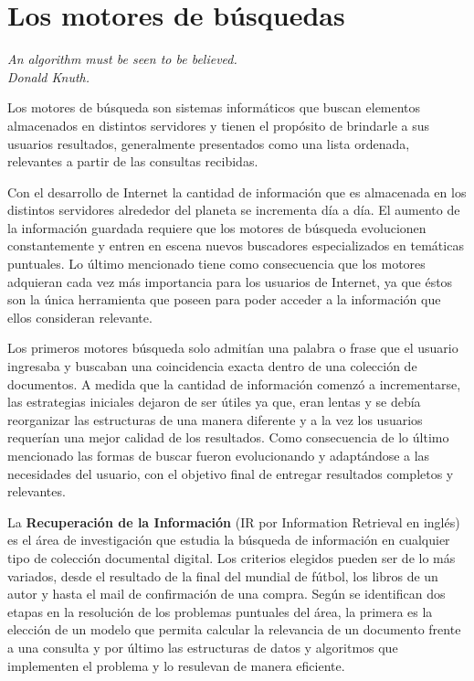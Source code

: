 \section{Los motores de búsquedas}
{\begin{small}%
\begin{flushright}%
\it An algorithm must be seen to be believed.\\Donald Knuth.
\end{flushright}%
\end{small}%
\vspace{.5cm}}
Los motores de búsqueda son sistemas informáticos que buscan elementos almacenados en distintos servidores y tienen el propósito de brindarle a sus usuarios resultados, generalmente presentados como una lista ordenada, relevantes a partir de las consultas recibidas.

Con el desarrollo de Internet la cantidad de información que es almacenada en los distintos servidores alrededor del planeta se incrementa día a día. El aumento de la información guardada requiere que los motores de búsqueda evolucionen constantemente y entren en escena nuevos buscadores especializados en temáticas puntuales. Lo último mencionado tiene como consecuencia que los motores adquieran cada vez más importancia para los usuarios de Internet, ya que éstos son la única herramienta que poseen para poder acceder a la información que ellos consideran relevante.

Los primeros motores búsqueda solo admitían una palabra o frase que el usuario ingresaba y buscaban una coincidencia exacta dentro de una colección de documentos. A medida que la cantidad de información comenzó a incrementarse, las estrategias iniciales dejaron de ser útiles ya que, eran lentas y se debía reorganizar las estructuras de una manera diferente y a la vez los usuarios requerían una mejor calidad de los resultados. Como consecuencia de lo último mencionado las formas de buscar fueron evolucionando y adaptándose a las necesidades del usuario, con el objetivo final de entregar resultados completos y relevantes.

La \textbf{Recuperación de la Información} (IR por Information Retrieval en inglés) \cite{Baeza-Yates:1999:MIR:553876,Manning:2008:IIR:1394399,Zobel:2006:IFT:1132956.1132959} es el área de investigación que estudia la búsqueda de información en cualquier tipo de colección documental digital. Los criterios elegidos pueden ser de lo más variados, desde el resultado de la final del mundial de fútbol, los libros de un autor y hasta el mail de confirmación de una compra. Según \cite{Baeza-Yates:1999:MIR:553876} se identifican dos etapas en la resolución de los problemas puntuales del área, la primera es la elección de un modelo que permita calcular la relevancia de un documento frente a una consulta y por último las estructuras de datos y algoritmos que implementen el problema y lo resulevan de manera eficiente.

